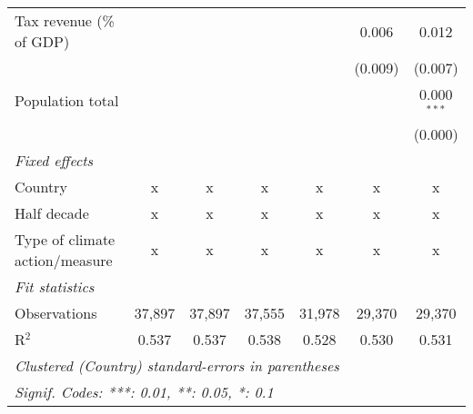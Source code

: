 \begin{tabular}{lcccccc}
   Tax revenue (\% of GDP)                       &         &              &               &               & 0.006         & 0.012\\   
                                                 &         &              &               &               & (0.009)       & (0.007)\\   
   Population total                              &         &              &               &               &               & 0.000$^{***}$\\   
                                                 &         &              &               &               &               & (0.000)\\   
   \emph{Fixed effects}\\
   Country                                       & x       & x            & x             & x             & x             & x\\  
   Half decade                                   & x       & x            & x             & x             & x             & x\\  
   Type of climate action/measure                & x       & x            & x             & x             & x             & x\\  
   \midrule \emph{Fit statistics}\\
   Observations                                  & 37,897  & 37,897       & 37,555        & 31,978        & 29,370        & 29,370\\  
   R$^2$                                         & 0.537   & 0.537        & 0.538         & 0.528         & 0.530         & 0.531\\  
   \midrule
   \multicolumn{7}{l}{\emph{Clustered (Country) standard-errors in parentheses}}\\
   \multicolumn{7}{l}{\emph{Signif. Codes: ***: 0.01, **: 0.05, *: 0.1}}\\
\end{tabular}
\par\endgroup


